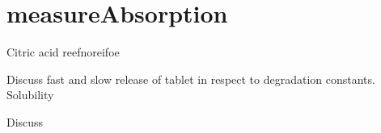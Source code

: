 \chapter{measureAbsorption}

Citric acid reefnoreifoe




Discuss fast and slow release of tablet in respect to degradation constants. Solubility

Discuss 